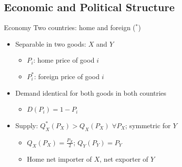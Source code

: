\documentclass{beamer}
\begin{document}
\subsection{Economic and Political Structure}
\begin{frame}{Economy}
Two countries: home and foreign (${}^*$)
\pause
\begin{itemize}[<+->]
	\item Separable in two goods: $X$ and $Y$
			\begin{itemize}
				\item $P_i$: home price of good $i$
				\item $P_i^*$: foreign price of good $i$
			\end{itemize}
	\item Demand identical for both goods in both countries
		\begin{itemize}
			\item $D(P_i) = 1 - P_i$
		\end{itemize}
	\item Supply: $Q_X^*(P_X) > Q_X(P_X)$ $\forall P_X$; symmetric for $Y$ 
		\begin{itemize}
			\item $Q_X(P_X) = \frac{P_X}{2}$; $Q_Y(P_Y) = P_Y$
			\item Home net importer of $X$, net exporter of $Y$
		\end{itemize}
\end{itemize}

\end{frame}

\end{document}
